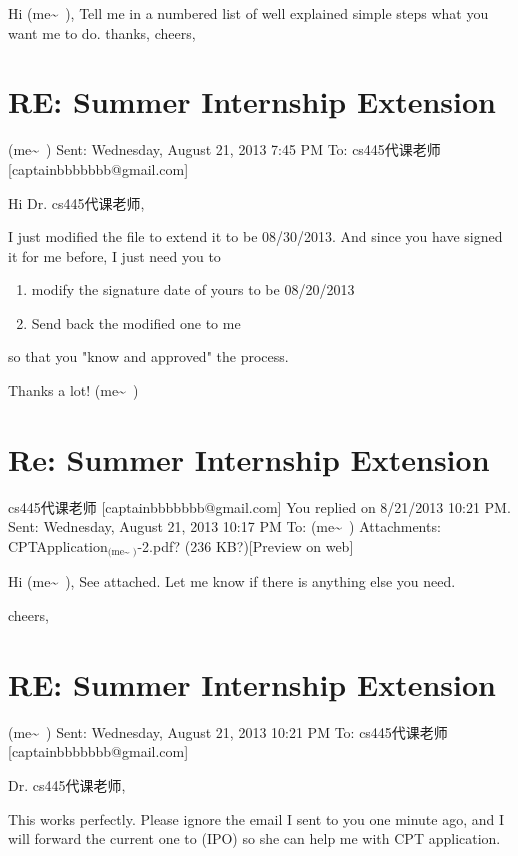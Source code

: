 \documentclass[12pt]{book}
\begin{document}
Hi (me\textasciitilde{}~),
       Tell me in a numbered list of well explained simple steps what you want me to do.
thanks,
cheers,


\section{RE: Summer Internship Extension}
\label{sec-36-4}
(me\textasciitilde{}~)
Sent:        Wednesday, August 21, 2013 7:45 PM
To:        
cs445代课老师 [captainbbbbbbb@gmail.com]

Hi Dr. cs445代课老师, 

I just modified the file to extend it to be 08/30/2013. And since you have signed it for me before, I just need you to 

\begin{enumerate}
\item modify the signature date of yours to be 08/20/2013
\item Send back the modified one to me
\end{enumerate}

so that you "know and approved" the process. 

Thanks a lot!
(me\textasciitilde{}~)


\section{Re: Summer Internship Extension}
\label{sec-36-5}
cs445代课老师 [captainbbbbbbb@gmail.com]
You replied on 8/21/2013 10:21 PM.
Sent:        Wednesday, August 21, 2013 10:17 PM
To:        
(me\textasciitilde{}~)
Attachments:        
CPTApplication$_{\text{(me\textasciitilde{}~)}}$-2.pdf? (236 KB?)[Preview on web]

Hi (me\textasciitilde{}~),
              See attached.   Let me know if there is anything else you need.

cheers,


\section{RE: Summer Internship Extension}
\label{sec-36-6}
(me\textasciitilde{}~)
Sent:        Wednesday, August 21, 2013 10:21 PM
To:        
cs445代课老师 [captainbbbbbbb@gmail.com]

Dr. cs445代课老师, 

This works perfectly. Please ignore the email I sent to you one minute ago, and I will forward the current one to (IPO) so she can help me with CPT application. 
\end{document}
